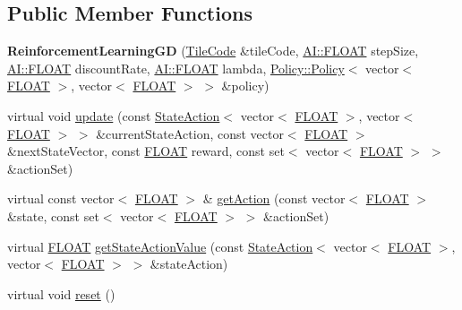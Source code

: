 \subsection*{Public Member Functions}
\begin{DoxyCompactItemize}
\item 
\hypertarget{classAI_1_1Algorithm_1_1ReinforcementLearningGD_a51985e4bd95a874482c4cc378b0fc86e}{{\bfseries Reinforcement\-Learning\-G\-D} (\hyperlink{classAI_1_1Algorithm_1_1TileCode}{Tile\-Code} \&tile\-Code, \hyperlink{namespaceAI_a41b74884a20833db653dded3918e05c3}{A\-I\-::\-F\-L\-O\-A\-T} step\-Size, \hyperlink{namespaceAI_a41b74884a20833db653dded3918e05c3}{A\-I\-::\-F\-L\-O\-A\-T} discount\-Rate, \hyperlink{namespaceAI_a41b74884a20833db653dded3918e05c3}{A\-I\-::\-F\-L\-O\-A\-T} lambda, \hyperlink{classAI_1_1Algorithm_1_1Policy_1_1Policy}{Policy\-::\-Policy}$<$ vector$<$ \hyperlink{namespaceAI_a41b74884a20833db653dded3918e05c3}{F\-L\-O\-A\-T} $>$, vector$<$ \hyperlink{namespaceAI_a41b74884a20833db653dded3918e05c3}{F\-L\-O\-A\-T} $>$ $>$ \&policy)}\label{classAI_1_1Algorithm_1_1ReinforcementLearningGD_a51985e4bd95a874482c4cc378b0fc86e}

\item 
virtual void \hyperlink{classAI_1_1Algorithm_1_1ReinforcementLearningGD_afca8d60ac090dec611f3834c0e8872c0}{update} (const \hyperlink{classAI_1_1StateAction}{State\-Action}$<$ vector$<$ \hyperlink{namespaceAI_a41b74884a20833db653dded3918e05c3}{F\-L\-O\-A\-T} $>$, vector$<$ \hyperlink{namespaceAI_a41b74884a20833db653dded3918e05c3}{F\-L\-O\-A\-T} $>$ $>$ \&current\-State\-Action, const vector$<$ \hyperlink{namespaceAI_a41b74884a20833db653dded3918e05c3}{F\-L\-O\-A\-T} $>$ \&next\-State\-Vector, const \hyperlink{namespaceAI_a41b74884a20833db653dded3918e05c3}{F\-L\-O\-A\-T} reward, const set$<$ vector$<$ \hyperlink{namespaceAI_a41b74884a20833db653dded3918e05c3}{F\-L\-O\-A\-T} $>$ $>$ \&action\-Set)
\item 
virtual const vector$<$ \hyperlink{namespaceAI_a41b74884a20833db653dded3918e05c3}{F\-L\-O\-A\-T} $>$ \& \hyperlink{classAI_1_1Algorithm_1_1ReinforcementLearningGD_a97a8fe122f39d0b47a9df496502c2555}{get\-Action} (const vector$<$ \hyperlink{namespaceAI_a41b74884a20833db653dded3918e05c3}{F\-L\-O\-A\-T} $>$ \&state, const set$<$ vector$<$ \hyperlink{namespaceAI_a41b74884a20833db653dded3918e05c3}{F\-L\-O\-A\-T} $>$ $>$ \&action\-Set)
\item 
virtual \hyperlink{namespaceAI_a41b74884a20833db653dded3918e05c3}{F\-L\-O\-A\-T} \hyperlink{classAI_1_1Algorithm_1_1ReinforcementLearningGD_a937edc4d2b11025bccbd450163155660}{get\-State\-Action\-Value} (const \hyperlink{classAI_1_1StateAction}{State\-Action}$<$ vector$<$ \hyperlink{namespaceAI_a41b74884a20833db653dded3918e05c3}{F\-L\-O\-A\-T} $>$, vector$<$ \hyperlink{namespaceAI_a41b74884a20833db653dded3918e05c3}{F\-L\-O\-A\-T} $>$ $>$ \&state\-Action)
\item 
virtual void \hyperlink{classAI_1_1Algorithm_1_1ReinforcementLearningGD_ad6f2fa8bc762d6760e9c61a132ccd098}{reset} ()
\end{DoxyCompactItemize}
